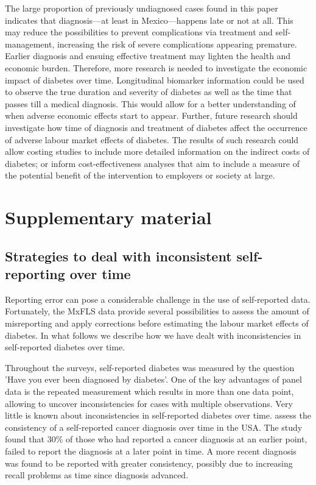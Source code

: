 \documentclass[12pt,english]{article}
\begin{document}
The large proportion of previously undiagnosed cases found in this paper indicates that diagnosis---at least in Mexico---happens late or not at all. This may reduce the possibilities to prevent complications via treatment and self-management, increasing the risk of severe complications appearing premature. Earlier diagnosis and ensuing effective treatment may lighten the health and economic burden. Therefore, more research is needed to investigate the economic impact of diabetes over time. Longitudinal biomarker information could be used to observe the true duration and severity of diabetes as well as the time that passes till a medical diagnosis. This would allow for a better understanding of when adverse economic effects start to appear. Further, future research should investigate how time of diagnosis and treatment of diabetes affect the occurrence of adverse labour market effects of diabetes. The results of such research could allow costing studies to include more detailed information on the indirect costs of diabetes; or inform cost-effectiveness analyses that aim to include a measure of the potential benefit of the intervention to employers or society at large. 

\printbibliography

	
\clearpage
\setcounter{table}{0}
\renewcommand{\thetable}{S\arabic{table}}
\setcounter{figure}{0}
\setcounter{page}{1}
\renewcommand{\thefigure}{S\arabic{figure}} %
\section*{Supplementary material}

\subsection*{\label{sec:Appendix}Strategies to deal with inconsistent self-reporting over time}

Reporting error can pose a considerable challenge in the use of self-reported data. Fortunately, the \ac{MxFLS} data provide several possibilities to assess the amount of misreporting and apply corrections before estimating the labour market effects of diabetes. In what follows we describe how we have dealt with inconsistencies in self-reported diabetes over time.

Throughout the surveys, self-reported diabetes was measured by the question 'Have you ever been diagnosed by diabetes'. One of the key advantages of panel data is the repeated measurement which results in more than one data point, allowing to uncover inconsistencies for cases with multiple observations. Very little is known about inconsistencies in self-reported diabetes over time. \textcite{Zajacova2010} assess the consistency of a self-reported cancer diagnosis over time in the USA. The study found that 30\% of those who had reported a cancer diagnosis at an earlier point, failed to report the diagnosis at a later point in time. A more recent diagnosis was found to be reported with greater consistency, possibly due to increasing recall problems as time since diagnosis advanced.
\end{document}
